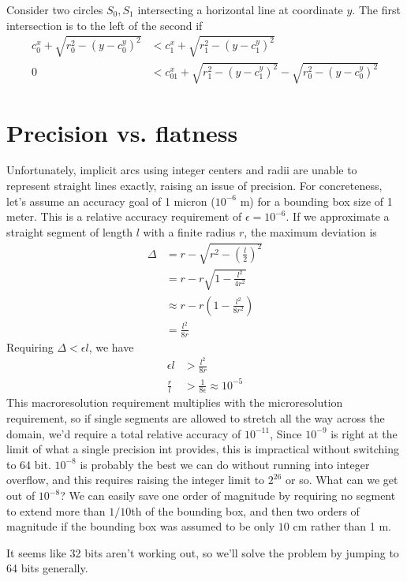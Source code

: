 \documentclass[11pt]{article}
\begin{document}
Consider two circles $S_0, S_1$ intersecting a horizontal line at coordinate $y$.  The first intersection is to the left of the second if
\begin{align*}
c_0^x + \sqrt{r_0^2 - (y-c_0^y)^2} &< c_1^x + \sqrt{r_1^2 - (y-c_1^y)^2} \\
0 &< c_{01}^x + \sqrt{r_1^2 - (y-c_1^y)^2} - \sqrt{r_0^2 - (y-c_0^y)^2}
\end{align*}

\section{Precision vs. flatness}

Unfortunately, implicit arcs using integer centers and radii are unable to represent straight lines exactly, raising an issue of precision.
For concreteness, let's assume an accuracy goal of 1 micron ($10^{-6}$ m) for a bounding box size of 1 meter.  This is a relative accuracy
requirement of $\epsilon = 10^{-6}$.  If we approximate a straight segment of length $l$ with a finite radius $r$, the maximum deviation is
\begin{align*}
\Delta &= r - \sqrt{r^2 - \left(\frac{l}{2}\right)^2} \\
       &= r - r \sqrt{1 - \frac{l^2}{4 r^2}} \\
       &\approx r - r \left(1 - \frac{l^2}{8 r^2} \right) \\
       &= \frac{l^2}{8 r}
\end{align*}
Requiring $\Delta < \epsilon l$, we have
\begin{align*}
\epsilon l &> \frac{l^2}{8 r} \\
\frac{r}{l} &> \frac{1}{8 \epsilon} \approx 10^{-5}
\end{align*}
This macroresolution requirement multiplies with the microresolution requirement, so if single segments are allowed to stretch all the way
across the domain, we'd require a total relative accuracy of $10^{-11}$,  Since $10^{-9}$ is right at the limit of what a single precision
int provides, this is impractical without switching to 64 bit.  $10^{-8}$ is probably the best we can do without running into integer overflow,
and this requires raising the integer limit to $2^{26}$ or so.  What can we get out of $10^{-8}$?  We can easily save one order of magnitude by
requiring no segment to extend more than $1/10$th of the bounding box, and then two orders of magnitude if the bounding box was assumed to be
only $10$ cm rather than 1 m.

It seems like 32 bits aren't working out, so we'll solve the problem by jumping to 64 bits generally.
\end{document}
